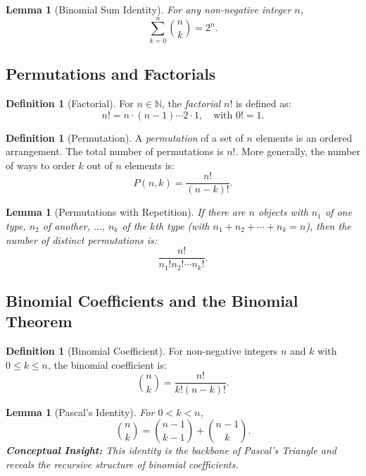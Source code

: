\documentclass[12pt]{article}
\newtheorem{lemma}[theorem]{Lemma}
\theoremstyle{definition}
\newtheorem{definition}[theorem]{Definition}
\begin{document}
\begin{lemma}[Binomial Sum Identity]
  For any non-negative integer \(n\),
  \[
  \sum_{k=0}^{n} \binom{n}{k} = 2^n.
  \]
\end{lemma}

\subsection{Permutations and Factorials}

\begin{definition}[Factorial]
  For \(n \in \mathbb{N}\), the \emph{factorial} \(n!\) is defined as:
  \[
  n! = n \cdot (n-1) \cdots 2 \cdot 1, \quad \text{with } 0! = 1.
  \]
\end{definition}

\begin{definition}[Permutation]
  A \emph{permutation} of a set of \(n\) elements is an ordered arrangement. The total number of permutations is \(n!\). More generally, the number of ways to order \(k\) out of \(n\) elements is:
  \[
  P(n,k) = \frac{n!}{(n-k)!}.
  \]
\end{definition}

\begin{lemma}[Permutations with Repetition]
  If there are \(n\) objects with \(n_1\) of one type, \(n_2\) of another, \(\dots\), \(n_k\) of the \(k\)th type (with \(n_1+n_2+\cdots+n_k = n\)), then the number of distinct permutations is:
  \[
  \frac{n!}{n_1!n_2!\cdots n_k!}.
  \]
\end{lemma}

\subsection{Binomial Coefficients and the Binomial Theorem}

\begin{definition}[Binomial Coefficient]
  For non-negative integers \(n\) and \(k\) with \(0 \le k \le n\), the binomial coefficient is:
  \[
  \binom{n}{k} = \frac{n!}{k!(n-k)!}.
  \]
\end{definition}

\begin{lemma}[Pascal's Identity]
  For \(0 < k < n\),
  \[
  \binom{n}{k} = \binom{n-1}{k-1} + \binom{n-1}{k}.
  \]
  \vspace{0.5em}
  \textbf{Conceptual Insight:} This identity is the backbone of Pascal's Triangle and reveals the recursive structure of binomial coefficients.
\end{lemma}
\end{document}
